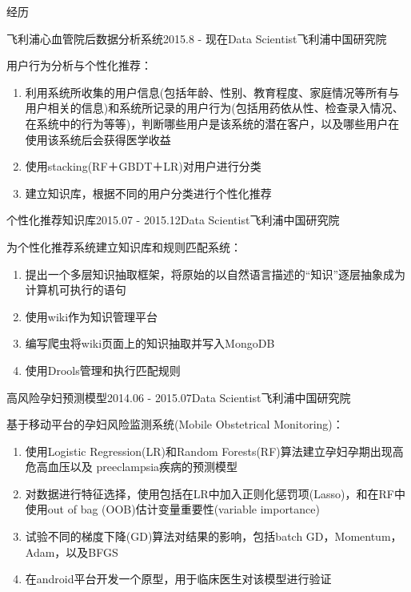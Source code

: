 \documentclass{resume} %
\begin{document}
\vspace{-10pt}
\begin{rSection}{经历}
\begin{rSubsection}{飞利浦心血管院后数据分析系统}{2015.8 -
    现在}{Data Scientist}{飞利浦中国研究院}
\item 用户行为分析与个性化推荐：
\begin{enumerate}
\item 利用系统所收集的用户信息(包括年龄、性别、教育程度、家庭情况等所有与用户相关的信息)和系统所记录的用户行为(包括用药依从性、检查录入情况、在系统中的行为等等)，判断哪些用户是该系统的潜在客户，以及哪些用户在使用该系统后会获得医学收益
\item 使用stacking(RF＋GBDT＋LR)对用户进行分类
\item 建立知识库，根据不同的用户分类进行个性化推荐
\end{enumerate}
\end{rSubsection}

\begin{rSubsection}{个性化推荐知识库}{2015.07 - 2015.12}{Data Scientist}{飞利浦中国研究院}
\item  为个性化推荐系统建立知识库和规则匹配系统：
\begin{enumerate}
\item 提出一个多层知识抽取框架，将原始的以自然语言描述的“知识”逐层抽象成为计算机可执行的语句 
\item 使用wiki作为知识管理平台
\item 编写爬虫将wiki页面上的知识抽取并写入MongoDB
\item 使用Drools管理和执行匹配规则 
\end{enumerate}
\end{rSubsection}

\begin{rSubsection}{高风险孕妇预测模型}{2014.06 - 2015.07}{Data Scientist}{飞利浦中国研究院}
\item 基于移动平台的孕妇风险监测系统(Mobile Obstetrical Monitoring)：
\begin{enumerate}
\item 使用Logistic Regression(LR)和Random Forests(RF)算法建立孕妇孕期出现高危高血压以及 preeclampsia疾病的预测模型
\item  对数据进行特征选择，使用包括在LR中加入正则化惩罚项(Lasso)，和在RF中使用out of bag (OOB)估计变量重要性(variable importance)
\item 试验不同的梯度下降(GD)算法对结果的影响，包括batch GD，Momentum，Adam，以及BFGS
\item 在android平台开发一个原型，用于临床医生对该模型进行验证
\end{enumerate}
\end{rSubsection}


\end{rSection}
\end{document}
